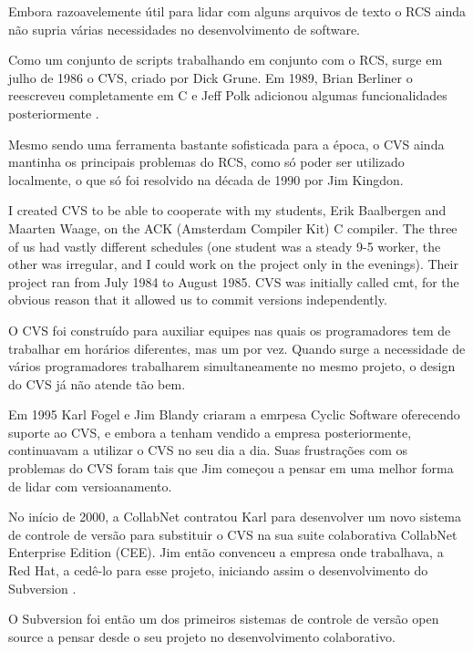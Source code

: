 Embora razoavelemente útil para lidar com alguns arquivos de texto
o RCS ainda não supria várias necessidades no desenvolvimento de software.

Como um conjunto de scripts trabalhando em conjunto com o RCS, surge em
julho de 1986 o CVS, criado por Dick Grune. Em 1989, Brian Berliner o
reescreveu completamente em C e Jeff Polk adicionou algumas
funcionalidades posteriormente \cite{Bar}.

Mesmo sendo uma ferramenta bastante sofisticada para a época, o CVS ainda
mantinha os principais problemas do RCS, como só poder
ser utilizado localmente, o que só foi resolvido na década de 1990 por
Jim Kingdon.

\begin{citacao}
I created CVS to be able to cooperate with my students, Erik Baalbergen and Maarten Waage, on the ACK (Amsterdam Compiler Kit) C compiler. The three of us had vastly different schedules (one student was a steady 9-5 worker, the other was irregular, and I could work on the project only in the evenings). Their project ran from July 1984 to August 1985. CVS was initially called cmt, for the obvious reason that it allowed us to commit versions independently.\\

\cite{Grune}
\end{citacao}

O CVS foi construído para auxiliar equipes nas quais os programadores tem
de trabalhar em horários diferentes, mas um por vez. Quando surge a necessidade
de vários programadores trabalharem simultaneamente no mesmo projeto, o design
do CVS já não atende tão bem.

Em 1995 Karl Fogel e Jim Blandy criaram a emrpesa Cyclic Software oferecendo
suporte ao CVS, e embora a tenham vendido a empresa posteriormente, continuavam
a utilizar o CVS no seu dia a dia. Suas frustrações com os problemas do CVS
foram tais que Jim começou a pensar em uma melhor forma de lidar com
versioanamento.

No início de 2000, a CollabNet contratou Karl para desenvolver um novo
sistema de controle de versão para substituir o CVS na sua suite colaborativa
CollabNet Enterprise Edition (CEE). Jim então convenceu a empresa onde trabalhava,
a Red Hat, a cedê-lo para esse projeto, iniciando assim o desenvolvimento
do Subversion \cite{Sussman}.

O Subversion foi então um dos primeiros sistemas de controle de versão
open source a pensar desde o seu projeto no desenvolvimento colaborativo.

